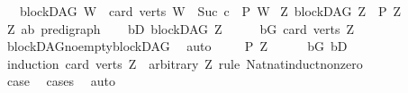 \begin{isabellebody}
\ \ {\isasymLongrightarrow}\ {\isacharparenleft}{\kern0pt}blockDAG\ W\ {\isasymLongrightarrow}\ card\ {\isacharparenleft}{\kern0pt}verts\ W{\isacharparenright}{\kern0pt}\ {\isacharequal}{\kern0pt}\ {\isacharparenleft}{\kern0pt}Suc\ c{\isacharparenright}{\kern0pt}\ {\isasymLongrightarrow}\ P\ W{\isacharparenright}{\kern0pt}{\isachardoublequoteclose}\isanewline
{}\ {\isachardoublequoteopen}{\isasymAnd}Z{\isachardot}{\kern0pt}\ blockDAG\ Z\ {\isasymLongrightarrow}\ P\ Z{\isachardoublequoteclose}\isanewline
%
\isadelimproof
%
\endisadelimproof
%
\isatagproof
{}\isamarkupfalse%
\ {\isacharminus}{\kern0pt}\ \isanewline
\ \ \isamarkupfalse%
\ Z{\isacharcolon}{\kern0pt}{\isacharcolon}{\kern0pt}\ {\isachardoublequoteopen}{\isacharparenleft}{\kern0pt}{\isacharprime}{\kern0pt}a{\isacharcomma}{\kern0pt}{\isacharprime}{\kern0pt}b{\isacharparenright}{\kern0pt}\ pre{\isacharunderscore}{\kern0pt}digraph{\isachardoublequoteclose}\isanewline
\ \ \isamarkupfalse%
\ bD{\isacharcolon}{\kern0pt}\ {\isachardoublequoteopen}blockDAG\ Z{\isachardoublequoteclose}\isanewline
\ \ \isamarkupfalse%
\ \isamarkupfalse%
\ bG{\isacharcolon}{\kern0pt}\ {\isachardoublequoteopen}card\ {\isacharparenleft}{\kern0pt}verts\ Z{\isacharparenright}{\kern0pt}\ {\isachargreater}{\kern0pt}\ {}{\isachardoublequoteclose}\ \isamarkupfalse%
\ blockDAG{\isachardot}{\kern0pt}no{\isacharunderscore}{\kern0pt}empty{\isacharunderscore}{\kern0pt}blockDAG\ \isamarkupfalse%
\ auto\ \isanewline
\ \ \isamarkupfalse%
\ {\isachardoublequoteopen}P\ Z{\isachardoublequoteclose}\isanewline
\ \ \ \ \isamarkupfalse%
\ bG\ bD\isanewline
\ \ \isamarkupfalse%
\ {\isacharparenleft}{\kern0pt}induction\ {\isachardoublequoteopen}card\ {\isacharparenleft}{\kern0pt}verts\ Z{\isacharparenright}{\kern0pt}{\isachardoublequoteclose}\ \ arbitrary{\isacharcolon}{\kern0pt}\ Z\ rule{\isacharcolon}{\kern0pt}\ Nat{\isachardot}{\kern0pt}nat{\isacharunderscore}{\kern0pt}induct{\isacharunderscore}{\kern0pt}non{\isacharunderscore}{\kern0pt}zero{\isacharparenright}{\kern0pt}\isanewline
\ \ \ \ \isamarkupfalse%
\ {}\isanewline
\ \ \ \ \isamarkupfalse%
\ \isamarkupfalse%
\ {\isacharquery}{\kern0pt}case\ \isamarkupfalse%
\ cases{\isacharparenleft}{\kern0pt}{}{\isacharparenright}{\kern0pt}\ \isamarkupfalse%
\ auto\isanewline
{}\isamarkupfalse%

\end{isabellebody}

